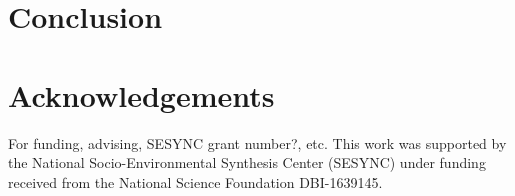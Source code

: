 \documentclass{article}
\begin{document}




\section{Conclusion}

\section{Acknowledgements}
For funding, advising, SESYNC grant number?, etc.
This work was supported by the National Socio-Environmental Synthesis Center (SESYNC) under funding received from the National Science Foundation DBI-1639145.

\printbibliography
\end{document}
